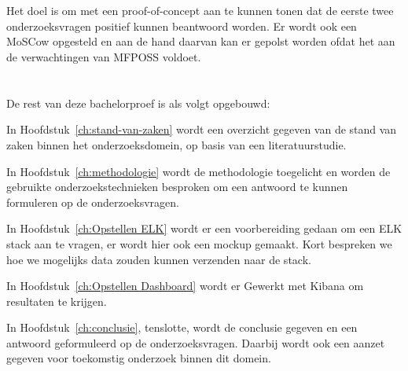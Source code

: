 \section{}%
\label{sec:onderzoeksdoelstelling}

Het doel is om met een proof-of-concept aan te kunnen tonen dat de eerste twee onderzoeksvragen positief kunnen beantwoord worden. Er wordt ook een MoSCow opgesteld en aan de hand daarvan kan er gepolst worden ofdat het aan de verwachtingen van MFPOSS voldoet.

\section{}%
\label{sec:opzet-bachelorproef}

De rest van deze bachelorproef is als volgt opgebouwd:

In Hoofdstuk~\ref{ch:stand-van-zaken} wordt een overzicht gegeven van de stand van zaken binnen het onderzoeksdomein, op basis van een literatuurstudie.

In Hoofdstuk~\ref{ch:methodologie} wordt de methodologie toegelicht en worden de gebruikte onderzoekstechnieken besproken om een antwoord te kunnen formuleren op de onderzoeksvragen.

In Hoofdstuk~\ref{ch:Opstellen ELK} wordt er een voorbereiding gedaan om een ELK stack aan te vragen, er wordt hier ook een mockup gemaakt. Kort bespreken we hoe we mogelijks data zouden kunnen verzenden naar de stack.

In Hoofdstuk~\ref{ch:Opstellen Dashboard} wordt er Gewerkt met Kibana om resultaten te krijgen.

In Hoofdstuk~\ref{ch:conclusie}, tenslotte, wordt de conclusie gegeven en een antwoord geformuleerd op de onderzoeksvragen. Daarbij wordt ook een aanzet gegeven voor toekomstig onderzoek binnen dit domein.